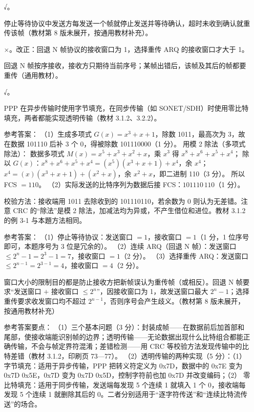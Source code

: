 \documentclass[a4paper,11pt]{article}
\begin{document}
\q √。\begin{analysis}停止等待协议中发送方每发送一个帧就停止发送并等待确认，超时未收到确认就重传该帧（教材第 8 版未展开，按通用教材补充）。\end{analysis}

\q ×。改正：回退 N 帧协议的接收窗口为 1，选择重传 ARQ 的接收窗口才大于 1。\begin{analysis}回退 N 帧按序接收，接收方只期待当前序号；某帧出错后，该帧及其后的帧都要重传（通用教材）。\end{analysis}

\q √。\begin{analysis}PPP 在异步传输时使用字节填充，在同步传输（如 SONET/SDH）时使用零比特填充，两者都能实现透明传输（教材 3.1.2、3.2.2）。\end{analysis}


\q 参考答案：
（1）生成多项式 $G(x)=x^3+x+1$，除数 1011，最高次为 3，故在数据 101110 后补 3 个 0，得被除数 101110000（1 分）。
用模 2 除法（多项式除法）：
数据多项式 $M(x)=x^5+x^3+x^2+x$，乘 $x^3$ 得 $x^8+x^6+x^5+x^4$；
除以 $G(x)$：$x^8+x^6+x^5+x^4=(x^5)(x^3+x+1)+x^4$，余 $x^4$；
$x^4=(x)(x^3+x+1)+(x^2+x)$，余 $x^2+x$，即二进制 110（3 分）。
所以 FCS $=110$。
（2）实际发送的比特序列为数据后接 FCS：$101110\,110$（1 分）。
\begin{analysis}校验方法：接收端用 1011 去除收到的 101110110，若余数为 0 则认为无差错。注意 CRC 的“除法”是模 2 除法，加减法均为异或，不产生借位和进位。教材 3.1.2 的例 3-1 与本題方法相同。\end{analysis}

\q 参考答案：
（1）停止等待协议：发送窗口 $=1$，接收窗口 $=1$（1 分，1 位序号即可，本题序号为 3 位是冗余的）。
（2）连续 ARQ（回退 N 帧）：发送窗口 $\leq 2^n-1=2^3-1=7$，接收窗口 $=1$（2 分）。
（3）选择重传 ARQ：发送窗口 $\leq 2^{n-1}=2^{3-1}=4$，接收窗口 $=4$（2 分）。
\begin{analysis}窗口大小的限制目的都是防止接收方把新帧误认为重传帧（或相反）。回退 N 帧要求“发送窗口 $+$ 接收窗口 $\leq 2^n$”，因接收窗口为 1，故发送窗口最大 $2^n-1$；选择重传要求收发窗口均不超过 $2^{n-1}$，否则序号会产生歧义。（教材第 8 版未展开，按通用教材补充）\end{analysis}


\q 参考答案要点：
（1）三个基本问题（3 分）：封装成帧——在数据前后加首部和尾部，使接收端能识别帧的边界；透明传输——无论数据出现什么比特组合都能正确传输，不会与帧定界符混淆；差错检测——用 CRC 等校验方法发现传输中的比特差错（教材 3.1.2，印刷页 73—77）。
（2）透明传输的两种实现（5 分）：（1） 字节填充：适用于异步传输，PPP 把转义符定义为 0x7D，数据中的 0x7E 变为 0x7D 0x5E，0x7D 变为 0x7D 0x5D，控制字符前也加 0x7D 并改变编码；（2） 零比特填充：适用于同步传输，发送端每发现 5 个连续 1 就填入 1 个 0，接收端每发现 5 个连续 1 就删除其后的 0。二者分别适用于“逐字符传送”和“连续比特流传送”的场合。
\end{document}
